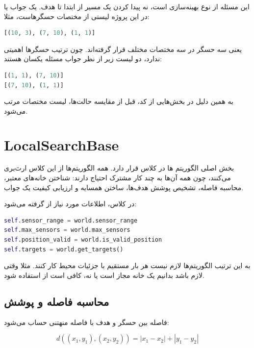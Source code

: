 \documentclass[10.5pt]{exam}
\begin{document}
این مسئله از نوع بهینه‌سازی است، نه پیدا کردن یک مسیر از ابتدا تا هدف. یک جواب یا
در این پروژه لیستی از مختصات حسگرهاست، مثلا:

\begin{latin}
\begin{lstlisting}[language=Python]
[(10, 3), (7, 10), (1, 1)]
\end{lstlisting}
\end{latin}

یعنی سه حسگر در سه مختصات مختلف قرار گرفته‌اند. چون ترتیب حسگرها اهمیتی ندارد، دو لیست زیر از نظر جواب مسئله یکسان هستند:

\begin{latin}
\begin{lstlisting}[language=Python]
[(1, 1), (7, 10)]
[(7, 10), (1, 1)]
\end{lstlisting}
\end{latin}

به همین دلیل در بخش‌هایی از کد، قبل از مقایسه حالت‌ها، لیست مختصات مرتب می‌شود.

\section{LocalSearchBase}
بخش اصلی الگوریتم ها در کلاس
قرار دارد. همه الگوریتم‌ها از این کلاس ارث‌بری می‌کنند، چون همه آن‌ها به چند کار مشترک احتیاج دارند: شناختن خانه‌های معتبر، محاسبه فاصله، تشخیص پوشش هدف‌ها، ساختن همسایه و ارزیابی کیفیت یک جواب.

در کلاس، اطلاعات مورد نیاز از
گرفته می‌شود:

\begin{latin}
\begin{lstlisting}[language=Python]
self.sensor_range = world.sensor_range
self.max_sensors = world.max_sensors
self.position_valid = world.is_valid_position
self.targets = world.get_targets()
\end{lstlisting}
\end{latin}

به این ترتیب الگوریتم‌ها لازم نیست هر بار مستقیم با جزئیات محیط کار کنند. مثلا وقتی لازم باشد بدانیم یک خانه مجاز است یا نه، کافی است از
استفاده شود.

\subsection{محاسبه فاصله و پوشش}
فاصله بین حسگر و هدف با فاصله منهتنی حساب می‌شود:

\[
    d((x_1,y_1),(x_2,y_2)) = |x_1-x_2| + |y_1-y_2|
\]
\end{document}
